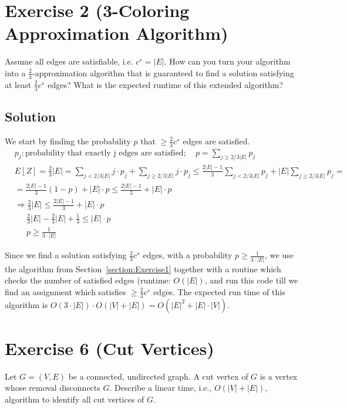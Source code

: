 \documentclass[a4paper, 12pt]{report}
\begin{document}
\section{Exercise 2 (3-Coloring Approximation Algorithm)}

Assume all edges are satisfiable, i.e. $c^∗ = |E|$. How can you turn your
algorithm into a $\frac{2}{3}$-approximation algorithm that is guaranteed to
find a solution satisfying at least $\frac{2}{3} c^∗$ edges? What is the
expected runtime of this extended algorithm?

\subsection{Solution}

We start by finding the probability $p$ that $≥ \frac{2}{3} c^∗$ edges are
satisfied.
\begin{align*}
    &p_{j}: \text{probability that exactly j edges are satisfied}; \quad
    p = ∑_{j≥2/3|E|}p_j\\
    & E[Z] =
    \frac{2}{3} |E| =
    ∑_{j<2/3|E|} j · p_j + ∑_{j≥2/3|E|} j · p_j ≤
    \frac{2|E|-1}{3} ∑_{j<2/3|E|} p_j + |E| ∑_{j≥2/3|E|} p_j =\\
    &= \frac{2|E|-1}{3} (1-p) + |E|·p ≤ \frac{2|E|-1}{3} + |E|·p\\
    &⇒ \frac{2}{3} |E| ≤ \frac{2|E|-1}{3} + |E|·p\\
    &\quad~~\frac{2}{3} |E| - \frac{2}{3} |E| + \frac{1}{3} ≤ |E|·p\\
    &\quad~~p≥\frac{1}{3·|E|}
\end{align*}

Since we find a solution satisfying $\frac{2}{3} c^∗$ edges, with a probability
$p≥\frac{1}{3·|E|}$, we use the algorithm from Section~\ref{section:Exercise1}
together with a routine which checks the number of satisfied edges (runtime:
$O(|E|)$, and run this code till we find an assignment which satisfies $≥
\frac{2}{3} c^∗$ edges. The expected run time of this algorithm is
$O(3·|E|)·O(|V|+|E|)=O(|E|^2+|E|·|V|)$.

\section{Exercise 6 (Cut Vertices)}

Let $G = (V, E)$ be a connected, undirected graph. A cut vertex of $G$ is a
vertex whose removal disconnects $G$. Describe a linear time, i.e., $O(|V | +
|E|)$, algorithm to identify all cut vertices of $G$.
\end{document}

